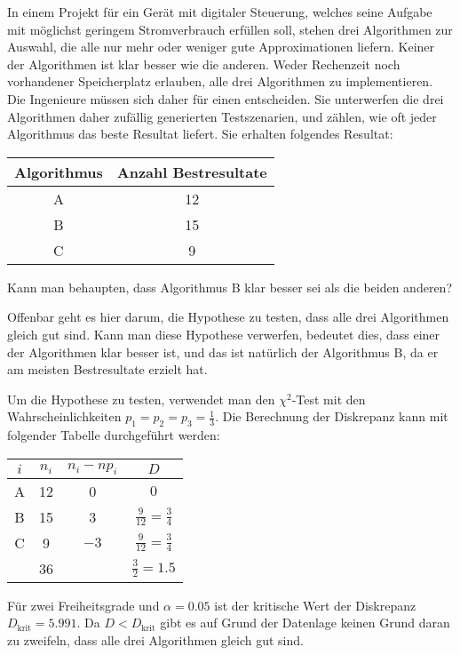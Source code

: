 In einem Projekt für ein Gerät mit digitaler Steuerung, welches
seine Aufgabe mit möglichst geringem Stromverbrauch erfüllen soll, stehen
drei Algorithmen zur Auswahl, die alle nur mehr oder weniger gute
Approximationen liefern. Keiner der Algorithmen ist klar besser wie
die anderen. Weder Rechenzeit noch vorhandener Speicherplatz
erlauben, alle drei Algorithmen zu implementieren. Die Ingenieure
müssen sich daher für einen entscheiden. Sie unterwerfen die drei
Algorithmen daher zufällig generierten Testszenarien, und zählen,
wie oft jeder Algorithmus das beste Resultat liefert. Sie erhalten
folgendes Resultat:
\begin{center}
\begin{tabular}{c|c}
Algorithmus&Anzahl Bestresultate\\
\hline
A&12\\
B&15\\
C&9\\
\end{tabular}
\end{center}
Kann man behaupten, dass Algorithmus B klar besser sei als die beiden
anderen?

\begin{loesung}
Offenbar geht es hier darum, die Hypothese zu testen, dass alle
drei Algorithmen gleich gut sind. Kann man diese Hypothese
verwerfen, bedeutet dies, dass einer der Algorithmen klar besser ist,
und das ist natürlich der Algorithmus B, da er am meisten Bestresultate
erzielt hat.

Um die Hypothese zu testen, verwendet man den $\chi^2$-Test mit
den Wahrscheinlichkeiten $p_1=p_2=p_3=\frac13$. Die Berechnung
der Diskrepanz kann mit folgender Tabelle durchgeführt werden:
\begin{center}
\begin{tabular}{|c|c|c|c|}
\hline
$i$&$n_i$&$n_i-np_i$&$D$\\
\hline
A&12&0&$0$\\
B&15&3&$\frac{9}{12}=\frac34$\\
C& 9&$-3$&$\frac{9}{12}=\frac34$\\
\hline
&36&&$\frac{3}{2}=1.5$\\
\hline
\end{tabular}
\end{center}
Für zwei Freiheitsgrade und $\alpha=0.05$ ist der kritische Wert der
Diskrepanz $D_{\text{krit}}=5.991$. Da $D<D_{\text{krit}}$ gibt es
auf Grund der Datenlage keinen Grund daran zu zweifeln, dass alle drei
Algorithmen gleich gut sind.
\end{loesung}

